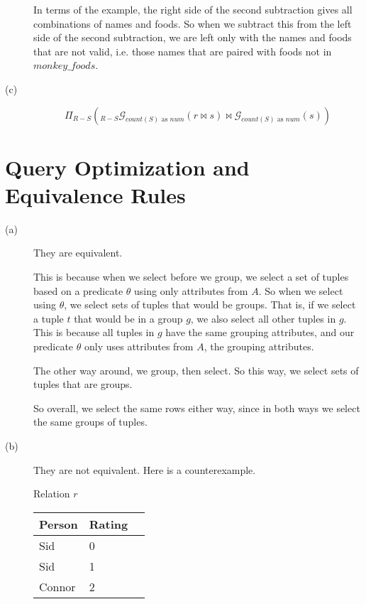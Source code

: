 \documentclass{article}
\begin{document}
\begin{description}
        In terms of the example, the right side of the second subtraction gives
        all combinations of names and foods. So when we subtract this from the left
        side of the second subtraction, we are left only with the names and
        foods that are not valid, i.e. those names that are paired with
        foods not in $monkey\_foods$.
    \item[(c)]
        \[ \Pi_{R-S}(_{R-S} \mathcal{G}_{count(S) \text{ as } num}(r \bowtie s)
            \bowtie \mathcal{G}_{count(S) \text{ as } num}(s)) \]
\end{description}
\section*{Query Optimization and Equivalence Rules}
\begin{description}
    \item[(a)]
        They are equivalent.

        This is because when we select before we group, we
        select a set of tuples based on a predicate $\theta$ using only attributes
        from $A$. So when we select using $\theta$, we select sets of tuples
        that would be groups. That is, if we select a tuple $t$ that would be in
        a group $g$, we also select all other tuples in $g$. This is because
        all tuples in $g$ have the same grouping attributes, and our predicate
        $\theta$ only uses attributes from $A$, the grouping attributes.

        The other way around, we group, then select. So this way,
        we select sets of tuples that are groups.

        So overall, we select the same rows either way, since in both ways
        we select the same groups of tuples.
    \item[(b)]
        They are not equivalent. Here is a counterexample.

        \begin{center}
            Relation $r$
            \begin{tabular}{ | l | l | p{5cm} |}
                \hline
                \textbf{Person} & \textbf{Rating} \\ \hline
                Sid & 0 \\ \hline
                Sid & 1 \\ \hline
                Connor & 2 \\ \hline
            \end{tabular}
        \end{center}


\end{description}
\end{document}
